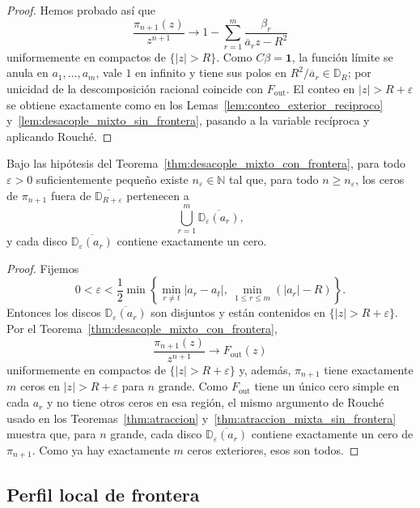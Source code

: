 \begin{proof}
	Hemos probado así que
	\[
		\frac{\pi_{n+1}(z)}{z^{n+1}}
		\longrightarrow
		1-\sum_{r=1}^m\frac{\beta_r}{\overline a_r z-R^2}
	\]
	uniformemente en compactos de $\{|z|>R\}$. Como $C\beta=\mathbf 1$, la función límite se anula en $a_1,\dots,a_m$, vale $1$ en infinito y tiene sus polos en $R^2/\overline a_r\in\mathbb D_R$; por unicidad de la descomposición racional coincide con $F_{\mathrm{out}}$. El conteo en $|z|>R+\varepsilon$ se obtiene exactamente como en los Lemas~\ref{lem:conteo_exterior_reciproco} y~\ref{lem:desacople_mixto_sin_frontera}, pasando a la variable recíproca y aplicando Rouché.

\end{proof}

\begin{cor}\label{cor:atraccion_exterior_mixto_frontera}
	Bajo las hipótesis del Teorema~\ref{thm:desacople_mixto_con_frontera}, para todo $\varepsilon>0$ suficientemente pequeño existe $n_\varepsilon\in\mathbb N$ tal que, para todo $n\ge n_\varepsilon$, los ceros de $\pi_{n+1}$ fuera de $\overline{\mathbb D_{R+\varepsilon}}$ pertenecen a
	\[
		\bigcup_{r=1}^m\overline{\mathbb D_\varepsilon(a_r)},
	\]
	y cada disco $\overline{\mathbb D_\varepsilon(a_r)}$ contiene exactamente un cero.
\end{cor}

\begin{proof}
	Fijemos
	\[
		0<\varepsilon<\frac12\min\left\{\min_{r\ne t}|a_r-a_t|,\ \min_{1\le r\le m}(|a_r|-R)\right\}.
	\]
	Entonces los discos $\overline{\mathbb D_\varepsilon(a_r)}$ son disjuntos y están contenidos en $\{|z|>R+\varepsilon\}$. Por el Teorema~\ref{thm:desacople_mixto_con_frontera},
	\[
		\frac{\pi_{n+1}(z)}{z^{n+1}}\longrightarrow F_{\mathrm{out}}(z)
	\]
	uniformemente en compactos de $\{|z|>R+\varepsilon\}$ y, además, $\pi_{n+1}$ tiene exactamente $m$ ceros en $|z|>R+\varepsilon$ para $n$ grande. Como $F_{\mathrm{out}}$ tiene un único cero simple en cada $a_r$ y no tiene otros ceros en esa región, el mismo argumento de Rouché usado en los Teoremas~\ref{thm:atraccion} y~\ref{thm:atraccion_mixta_sin_frontera} muestra que, para $n$ grande, cada disco $\overline{\mathbb D_\varepsilon(a_r)}$ contiene exactamente un cero de $\pi_{n+1}$. Como ya hay exactamente $m$ ceros exteriores, esos son todos.
\end{proof}

\subsection{Perfil local de frontera}

